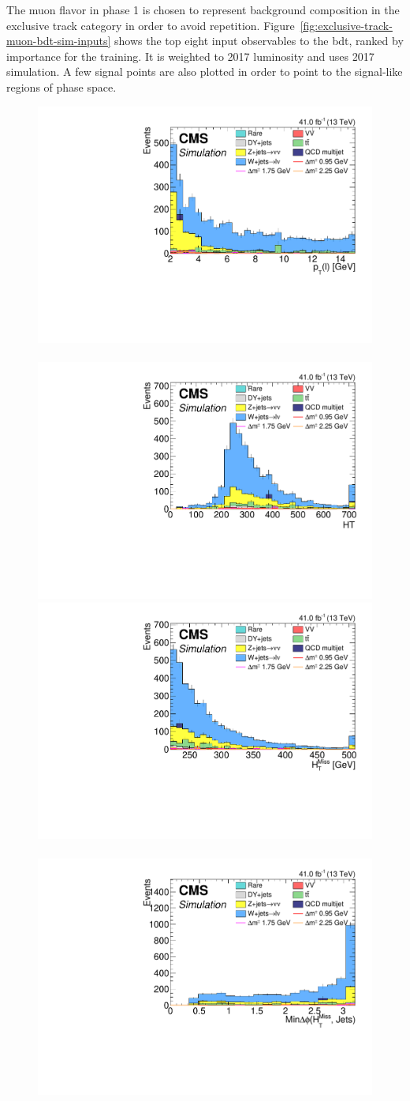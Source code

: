 The muon flavor in phase 1 is chosen to represent background composition in the exclusive track category in order to avoid repetition. Figure~\ref{fig:exclusive-track-muon-bdt-sim-inputs} shows the top eight input observables to the \gls{bdt}, ranked by importance for the training. It is weighted to 2017 luminosity and uses 2017 simulation. A few signal points are also plotted in order to point to the signal-like regions of phase space.

\begin{figure}[!htb]
\centering
\includegraphics[width=0.48\linewidth]{plots/track_muon_bg_signal/none_leptonCorrJetNoMultIso10Dr0.6.Pt().pdf} \,
\includegraphics[width=0.48\linewidth]{plots/track_muon_bg_signal/none_HT.pdf} \\
\includegraphics[width=0.48\linewidth]{plots/track_muon_bg_signal/none_MHT.pdf} \,
\includegraphics[width=0.48\linewidth]{plots/track_muon_bg_signal/none_MinDeltaPhiMhtJets.pdf} \\

\end{figure}
